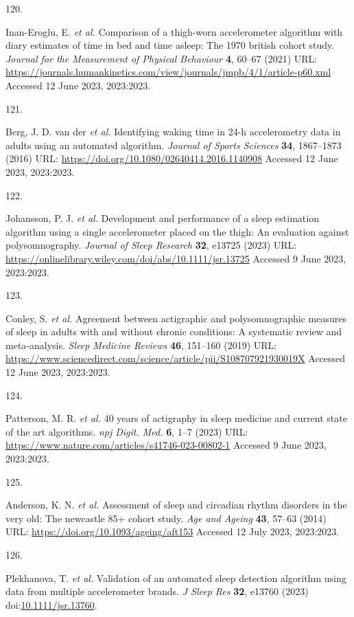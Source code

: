\documentclass[
  9pt,
]{scrbook}
\newlength{\cslhangindent}
\newlength{\csllabelwidth}
\newlength{\cslentryspacingunit} %
\newenvironment{CSLReferences}[2] %
 {%
  \setlength{\parindent}{0pt}
  \ifodd #1
  \let\oldpar\par
  \def\par{\hangindent=\cslhangindent\oldpar}
  \fi
  \setlength{\parskip}{#2\cslentryspacingunit}
 }%
 {}
\newcommand{\CSLLeftMargin}[1]{\parbox[t]{\csllabelwidth}{#1}}
\newcommand{\CSLRightInline}[1]{\parbox[t]{\linewidth - \csllabelwidth}{#1}\break}
\begin{document}
\begin{CSLReferences}{0}{0}
\leavevmode{}%
\CSLLeftMargin{120. }%
\CSLRightInline{Inan-Eroglu, E. \emph{et al.} Comparison of a thigh-worn
accelerometer algorithm with diary estimates of time in bed and time
asleep: The 1970 british cohort study. \emph{Journal for the Measurement
of Physical Behaviour} \textbf{4}, 60--67 (2021) URL:
\url{https://journals.humankinetics.com/view/journals/jmpb/4/1/article-p60.xml}
Accessed 12 June 2023, 2023:2023.}

\leavevmode{}%
\CSLLeftMargin{121. }%
\CSLRightInline{Berg, J. D. van der \emph{et al.} Identifying waking
time in 24-h accelerometry data in adults using an automated algorithm.
\emph{Journal of Sports Sciences} \textbf{34}, 1867--1873 (2016) URL:
\url{https://doi.org/10.1080/02640414.2016.1140908} Accessed 12 June
2023, 2023:2023.}

\leavevmode{}%
\CSLLeftMargin{122. }%
\CSLRightInline{Johansson, P. J. \emph{et al.} Development and
performance of a sleep estimation algorithm using a single accelerometer
placed on the thigh: An evaluation against polysomnography.
\emph{Journal of Sleep Research} \textbf{32}, e13725 (2023) URL:
\url{https://onlinelibrary.wiley.com/doi/abs/10.1111/jsr.13725} Accessed
9 June 2023, 2023:2023.}

\leavevmode{}%
\CSLLeftMargin{123. }%
\CSLRightInline{Conley, S. \emph{et al.} Agreement between actigraphic
and polysomnographic measures of sleep in adults with and without
chronic conditions: A systematic review and meta-analysis. \emph{Sleep
Medicine Reviews} \textbf{46}, 151--160 (2019) URL:
\url{https://www.sciencedirect.com/science/article/pii/S108707921930019X}
Accessed 12 June 2023, 2023:2023.}

\leavevmode{}%
\CSLLeftMargin{124. }%
\CSLRightInline{Patterson, M. R. \emph{et al.} 40 years of actigraphy in
sleep medicine and current state of the art algorithms. \emph{npj Digit.
Med.} \textbf{6}, 1--7 (2023) URL:
\url{https://www.nature.com/articles/s41746-023-00802-1} Accessed 9 June
2023, 2023:2023.}

\leavevmode{}%
\CSLLeftMargin{125. }%
\CSLRightInline{Anderson, K. N. \emph{et al.} Assessment of sleep and
circadian rhythm disorders in the very old: The newcastle 85+ cohort
study. \emph{Age and Ageing} \textbf{43}, 57--63 (2014) URL:
\url{https://doi.org/10.1093/ageing/aft153} Accessed 12 July 2023,
2023:2023.}

\leavevmode{}%
\CSLLeftMargin{126. }%
\CSLRightInline{Plekhanova, T. \emph{et al.} Validation of an automated
sleep detection algorithm using data from multiple accelerometer brands.
\emph{J Sleep Res} \textbf{32}, e13760 (2023)
doi:\href{https://doi.org/10.1111/jsr.13760}{10.1111/jsr.13760}.}

\end{CSLReferences}
\end{document}
